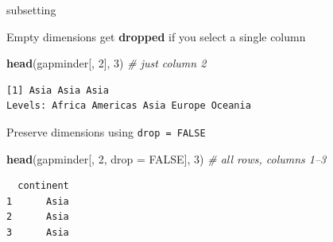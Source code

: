 \documentclass[10pt,ignorenonframetext,compress, aspectratio=169]{beamer}
\newenvironment{Shaded}{\begin{snugshade}}{\end{snugshade}}
\newcommand{\KeywordTok}[1]{\textcolor[rgb]{0.13,0.29,0.53}{\textbf{{#1}}}}
\newcommand{\DataTypeTok}[1]{\textcolor[rgb]{0.13,0.29,0.53}{{#1}}}
\newcommand{\DecValTok}[1]{\textcolor[rgb]{0.00,0.00,0.81}{{#1}}}
\newcommand{\CommentTok}[1]{\textcolor[rgb]{0.56,0.35,0.01}{\textit{{#1}}}}
\newcommand{\OtherTok}[1]{\textcolor[rgb]{0.56,0.35,0.01}{{#1}}}
\newcommand{\NormalTok}[1]{{#1}}
\begin{document}
\begin{frame}[fragile]{subsetting}

Empty dimensions get \textbf{dropped} if you select a single column

\scriptsize

\begin{Shaded}
\begin{Highlighting}[]
\KeywordTok{head}\NormalTok{(gapminder[, }\DecValTok{2}\NormalTok{], }\DecValTok{3}\NormalTok{)                 }\CommentTok{# just column 2}
\end{Highlighting}
\end{Shaded}

\begin{verbatim}
[1] Asia Asia Asia
Levels: Africa Americas Asia Europe Oceania
\end{verbatim}

\normalsize

Preserve dimensions using \texttt{drop = FALSE}

\scriptsize

\begin{Shaded}
\begin{Highlighting}[]
\KeywordTok{head}\NormalTok{(gapminder[, }\DecValTok{2}\NormalTok{, }\DataTypeTok{drop =} \OtherTok{FALSE}\NormalTok{], }\DecValTok{3}\NormalTok{)   }\CommentTok{# all rows, columns 1--3}
\end{Highlighting}
\end{Shaded}

\begin{verbatim}
  continent
1      Asia
2      Asia
3      Asia
\end{verbatim}

\normalsize

\end{frame}
\end{document}
